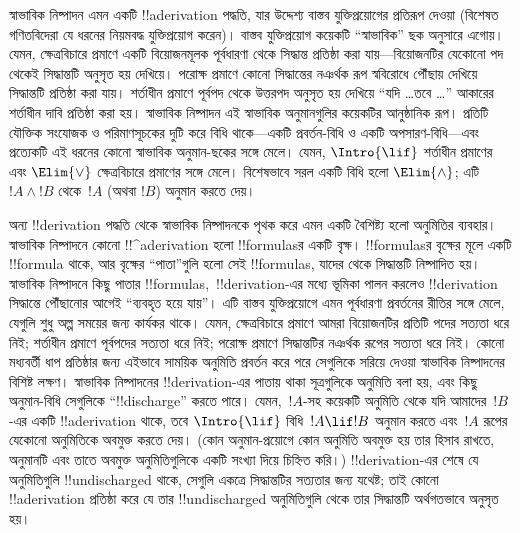 \documentclass[../../../include/open-logic-section]{subfiles}
\begin{document}
      {}
      {}


স্বাভাবিক নিষ্পাদন এমন একটি !!a{derivation} পদ্ধতি, যার উদ্দেশ্য বাস্তব
যুক্তিপ্রয়োগের প্রতিরূপ দেওয়া (বিশেষত গণিতবিদেরা যে ধরনের নিয়মবদ্ধ
যুক্তিপ্রয়োগ করেন)। বাস্তব যুক্তিপ্রয়োগ কয়েকটি “স্বাভাবিক” ছক অনুসারে
এগোয়। যেমন, ক্ষেত্রবিচারে প্রমাণে একটি বিয়োজনমূলক পূর্বধারণা থেকে সিদ্ধান্ত
প্রতিষ্ঠা করা যায়—বিয়োজনটির যেকোনো পদ থেকেই সিদ্ধান্তটি অনুসৃত হয় দেখিয়ে।
পরোক্ষ প্রমাণে কোনো সিদ্ধান্তের নঞর্থক রূপ স্ববিরোধে পৌঁছায় দেখিয়ে সিদ্ধান্তটি
প্রতিষ্ঠা করা যায়। শর্তাধীন প্রমাণে পূর্বপদ থেকে উত্তরপদ অনুসৃত হয় দেখিয়ে
“যদি \dots তবে \dots” আকারের শর্তাধীন দাবি প্রতিষ্ঠা করা হয়। স্বাভাবিক
নিষ্পাদন এই স্বাভাবিক অনুমানগুলির কয়েকটির আনুষ্ঠানিক রূপ। প্রতিটি যৌক্তিক
সংযোজক ও পরিমাণসূচকের দুটি করে বিধি থাকে—একটি প্রবর্তন-বিধি ও একটি
অপসারণ-বিধি—এবং প্রত্যেকটি এই ধরনের কোনো স্বাভাবিক অনুমান-ছকের সঙ্গে মেলে।
যেমন, $\Intro{\lif}$ শর্তাধীন প্রমাণের এবং $\Elim{\lor}$ ক্ষেত্রবিচারে
প্রমাণের সঙ্গে মেলে। বিশেষভাবে সরল একটি বিধি হলো $\Elim{\land}$; এটি
$!A \land !B$ থেকে~$!A$ (অথবা $!B$) অনুমান করতে দেয়।

অন্য !!{derivation} পদ্ধতি থেকে স্বাভাবিক নিষ্পাদনকে পৃথক করে এমন একটি
বৈশিষ্ট্য হলো অনুমিতির ব্যবহার। স্বাভাবিক নিষ্পাদনে কোনো
!!^a{derivation} হলো !!{formula}sর একটি বৃক্ষ। !!{formula}sর
বৃক্ষের মূলে একটি !!{formula} থাকে, আর বৃক্ষের “পাতা”গুলি হলো সেই
!!{formula}s, যাদের থেকে সিদ্ধান্তটি নিষ্পাদিত হয়। স্বাভাবিক নিষ্পাদনে
কিছু পাতার !!{formula}s,~!!{derivation}-এর মধ্যে ভূমিকা পালন করলেও
!!{derivation} সিদ্ধান্তে পৌঁছানোর আগেই “ব্যবহৃত হয়ে যায়”। এটি বাস্তব
যুক্তিপ্রয়োগে এমন পূর্বধারণা প্রবর্তনের রীতির সঙ্গে মেলে, যেগুলি শুধু অল্প
সময়ের জন্য কার্যকর থাকে। যেমন, ক্ষেত্রবিচারে প্রমাণে আমরা বিয়োজনটির
প্রতিটি পদের সত্যতা ধরে নিই; শর্তাধীন প্রমাণে পূর্বপদের সত্যতা ধরে নিই;
পরোক্ষ প্রমাণে সিদ্ধান্তটির নঞর্থক রূপের সত্যতা ধরে নিই। কোনো মধ্যবর্তী
ধাপ প্রতিষ্ঠার জন্য এইভাবে সাময়িক অনুমিতি প্রবর্তন করে পরে সেগুলিকে
সরিয়ে দেওয়া স্বাভাবিক নিষ্পাদনের বিশিষ্ট লক্ষণ। স্বাভাবিক নিষ্পাদনের
!!{derivation}-এর পাতায় থাকা সূত্রগুলিকে অনুমিতি বলা হয়, এবং কিছু
অনুমান-বিধি সেগুলিকে “!!{discharge}” করতে পারে। যেমন,~$!A$-সহ কয়েকটি
অনুমিতি থেকে যদি আমাদের~$!B$-এর একটি !!a{derivation} থাকে, তবে
$\Intro{\lif}$ বিধি~$!A \lif !B$ অনুমান করতে এবং~$!A$ রূপের যেকোনো
অনুমিতিকে অবমুক্ত করতে দেয়। (কোন অনুমান-প্রয়োগে কোন অনুমিতি অবমুক্ত হয় তার
হিসাব রাখতে, অনুমানটি এবং তাতে অবমুক্ত অনুমিতিগুলিকে একটি সংখ্যা দিয়ে
চিহ্নিত করি।) !!{derivation}-এর শেষে যে অনুমিতিগুলি !!{undischarged}
থাকে, সেগুলি একত্রে সিদ্ধান্তটির সত্যতার জন্য যথেষ্ট; তাই কোনো
!!a{derivation} প্রতিষ্ঠা করে যে তার !!{undischarged} অনুমিতিগুলি থেকে
তার সিদ্ধান্তটি অর্থগতভাবে অনুসৃত হয়।
\end{document}
